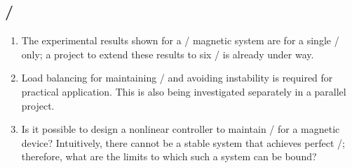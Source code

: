 \documentclass[10pt,a4paper]{memoir}
\begin{document}
\subsection{\QZS/}

\begin{enumerate}
\item
The experimental results shown for a \qzs/ magnetic system are for a single \dof/ only; a project to extend these results to six \dof/ is already under way.

\item
Load balancing for maintaining \qzs/ and avoiding instability is required for practical application.
This is also being investigated separately in a parallel project.

\item
Is it possible to design a nonlinear controller to maintain \qzs/ for a magnetic device?
Intuitively, there cannot be a stable system that achieves perfect \qzs/; therefore, what are the limits to which such a system can be bound?
\end{enumerate}
\end{document}
